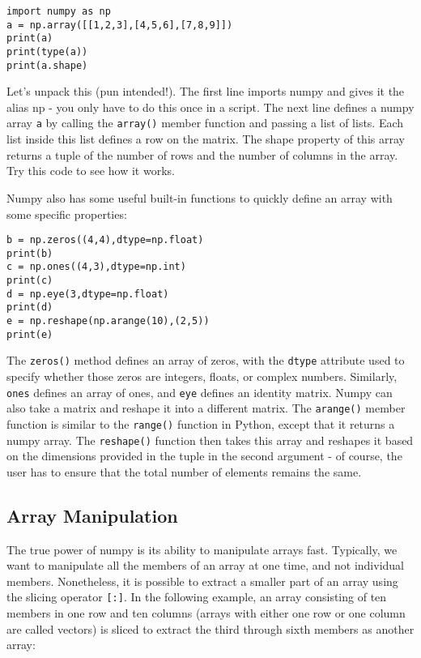 \documentclass[12pt]{article}
\newcommand{\code}{\texttt}
\begin{document}
\begin{lstlisting}[frame=single] 
import numpy as np
a = np.array([[1,2,3],[4,5,6],[7,8,9]])
print(a)
print(type(a))
print(a.shape)
\end{lstlisting} 

Let's unpack this (pun intended!). The first line imports numpy and gives it the alias np - you only have to do this once in a script. The next line defines a numpy array \code{a} by calling the \code{array()} member function and passing a list of lists. Each list inside this list defines a row on the matrix. The shape property of this array returns a tuple of the number of rows and the number of columns in the array. Try this code to see how it works.

Numpy also has some useful built-in functions to quickly define an array with some specific properties:

\begin{lstlisting}[frame=single] 
b = np.zeros((4,4),dtype=np.float)
print(b)
c = np.ones((4,3),dtype=np.int)
print(c)
d = np.eye(3,dtype=np.float)
print(d)
e = np.reshape(np.arange(10),(2,5))
print(e)
\end{lstlisting}

The \code{zeros()} method defines an array of zeros, with the \code{dtype} attribute used to specify whether those zeros are integers, floats, or complex numbers. Similarly, \code{ones} defines an array of ones, and \code{eye} defines an identity matrix. Numpy can also take a matrix and reshape it into a different matrix. The \code{arange()} member function is similar to the \code{range()} function in Python, except that it returns a numpy array. The \code{reshape()} function then takes this array and reshapes it based on the dimensions provided in the tuple in the second argument - of course, the user has to ensure that the total number of elements remains the same.

\subsection{Array Manipulation}
The true power of numpy is its ability to manipulate arrays fast. Typically, we want to manipulate all the members of an array at one time, and not individual members. Nonetheless, it is possible to extract a smaller part of an array using the slicing operator \code{[:]}. In the following example, an array consisting of ten members in one row and ten columns (arrays with either one row or one column are called vectors) is sliced to extract the third through sixth members as another array:
\end{document}
